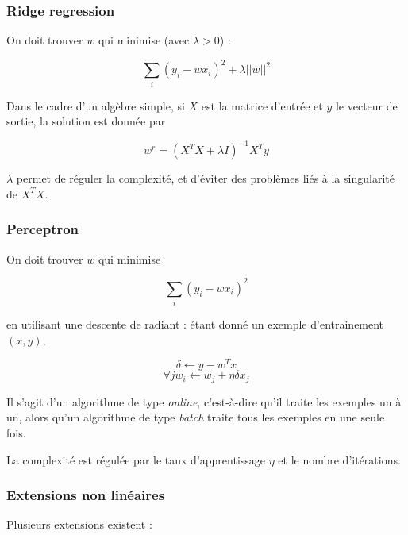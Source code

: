 \documentclass[10pt,a4paper]{report}
\begin{document}
			\subsubsection{Ridge regression}
			
			On doit trouver $w$ qui minimise (avec $\lambda > 0$) :
			
			$$\sum_i (y_i - wx_i)^2 + \lambda \vert \vert w \vert \vert^2$$
			
			Dans le cadre d'un algèbre simple, si $X$ est la matrice d'entrée et $y$ le vecteur de sortie, la solution est donnée par
			
			$$w^r = (X^T X + \lambda I)^{-1}X^Ty$$
			
			$\lambda$ permet de réguler la complexité, et d'éviter des problèmes liés à la singularité de $X^TX$.
			
			\subsubsection{Perceptron}
			
			On doit trouver $w$ qui minimise
			
			$$\sum_i (y_i - wx_i)^2$$
			
			en utilisant une descente de radiant : étant donné un exemple d'entrainement $(x, y)$,
			
			$$\delta \leftarrow y - w^Tx$$
			$$\forall jw_i \leftarrow w_j + \eta \delta x_j$$
			
			Il s'agit d'un algorithme de type \textit{online}, c'est-à-dire qu'il traite les exemples un à un, alors qu'un algorithme de type \textit{batch} traite tous les exemples en une seule fois.
			
			La complexité est régulée par le taux d'apprentissage $\eta$ et le nombre d'itérations.
			
			\subsubsection{Extensions non linéaires}
			
			Plusieurs extensions existent :
			
\end{document}
